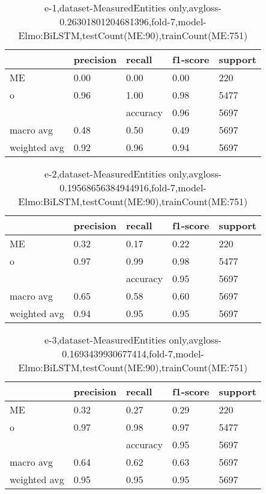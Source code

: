 \begin{table}[!ht] 
\centering
\caption{e-1,dataset-MeasuredEntities only,avgloss-0.26301801204681396,fold-7,model-Elmo:BiLSTM,testCount(ME:90),trainCount(ME:751)}\label{e-1data-meS.tsv}
\begin{tabularx}{300pt}{|X|X|X|X|X|}
\hline
&precision&recall&f1-score&support\\
\hline
ME&0.00&0.00&0.00&220\\
\hline
o&0.96&1.00&0.98&5477\\
\hline
&&accuracy&0.96&5697\\
\hline
macro avg&0.48&0.50&0.49&5697\\
\hline
weighted avg&0.92&0.96&0.94&5697\\
\hline
\end{tabularx}
\end{table}
\begin{table}[!ht] 
\centering
\caption{e-2,dataset-MeasuredEntities only,avgloss-0.19568656384944916,fold-7,model-Elmo:BiLSTM,testCount(ME:90),trainCount(ME:751)}\label{e-2data-meS.tsv}
\begin{tabularx}{300pt}{|X|X|X|X|X|}
\hline
&precision&recall&f1-score&support\\
\hline
ME&0.32&0.17&0.22&220\\
\hline
o&0.97&0.99&0.98&5477\\
\hline
&&accuracy&0.95&5697\\
\hline
macro avg&0.65&0.58&0.60&5697\\
\hline
weighted avg&0.94&0.95&0.95&5697\\
\hline
\end{tabularx}
\end{table}
\begin{table}[!ht] 
\centering
\caption{e-3,dataset-MeasuredEntities only,avgloss-0.1693439930677414,fold-7,model-Elmo:BiLSTM,testCount(ME:90),trainCount(ME:751)}\label{e-3data-meS.tsv}
\begin{tabularx}{300pt}{|X|X|X|X|X|}
\hline
&precision&recall&f1-score&support\\
\hline
ME&0.32&0.27&0.29&220\\
\hline
o&0.97&0.98&0.97&5477\\
\hline
&&accuracy&0.95&5697\\
\hline
macro avg&0.64&0.62&0.63&5697\\
\hline
weighted avg&0.95&0.95&0.95&5697\\
\hline
\end{tabularx}
\end{table}
